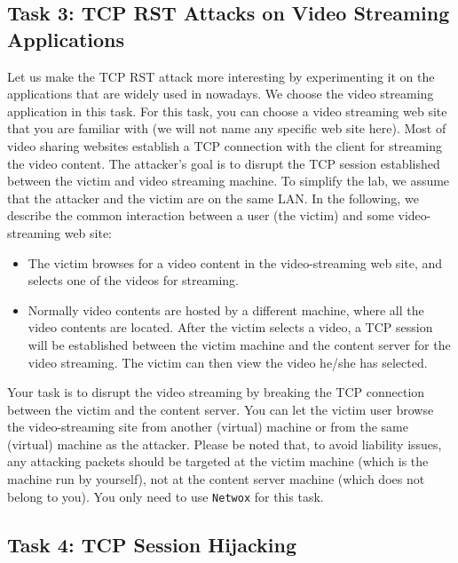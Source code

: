 \subsection {Task 3: TCP RST Attacks on Video Streaming Applications}

Let us make the TCP RST attack more interesting by experimenting it on 
the applications that are widely used in nowadays.
We choose the video streaming application in 
this task. For this task, you can choose a video streaming web site that you 
are familiar with (we will not name any specific web site here).  Most of
video sharing websites establish a TCP connection with the client for 
streaming the video content. The attacker's goal is to disrupt the TCP session 
established between the victim and video streaming machine. To 
simplify the lab, we assume that the attacker and the victim are on the 
same LAN. In the following, we describe the common interaction between
a user (the victim) and some video-streaming web site:

\begin{itemize}
\item The victim browses for a video content in the video-streaming web 
site, and selects one of the videos for streaming. 

\item Normally video contents are hosted by a different machine,
where all the video contents are located. After the victim selects 
a video, a TCP session will be established between the victim 
machine and the content server for the video streaming.
The victim can then view the video he/she has selected.
\end{itemize}

Your task is to disrupt the video streaming by breaking the 
TCP connection between the victim and the content server.
You can let the victim user browse the video-streaming 
site from another (virtual) machine or from the same (virtual) machine
as the attacker. Please be noted that, to avoid liability issues,
any attacking packets should be targeted 
at the victim machine (which is the machine run by yourself), 
not at the content server machine (which does not belong to you).
You only need to use \texttt{Netwox} for this task.  

            

\subsection{Task 4: TCP Session Hijacking}



